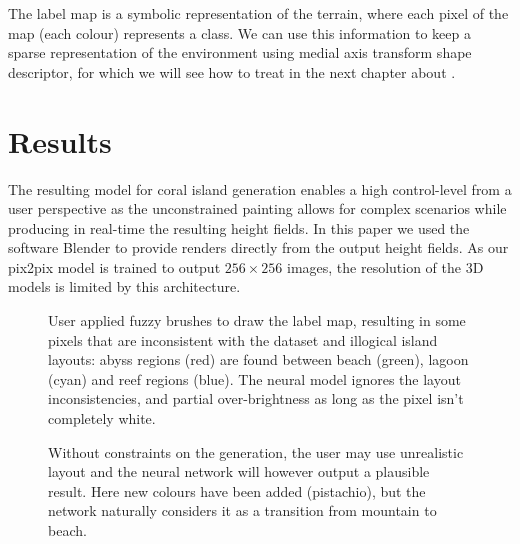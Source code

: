 The label map is a symbolic representation of the terrain, where each pixel of the map (each colour) represents a class. We can use this information to keep a sparse representation of the environment using medial axis transform shape descriptor, for which we will see how to treat in the next chapter about .


\section{Results}
\label{sec:coral-island-results}

The resulting model for coral island generation enables a high control-level from a user perspective as the unconstrained painting allows for complex scenarios while producing in real-time the resulting height fields. In this paper we used the software Blender to provide renders directly from the output height fields. As our pix2pix model is trained to output $256\times256$ images, the resolution of the 3D models is limited by this architecture.

\begin{figure}
\caption{User applied fuzzy brushes to draw the label map, resulting in some pixels that are inconsistent with the dataset and illogical island layouts: abyss regions (red) are found between beach (green), lagoon (cyan) and reef regions (blue). The neural model ignores the layout inconsistencies, and partial over-brightness as long as the pixel isn't completely white.}
\label{fig:coral-island-results-fuzzy}
\end{figure}
\begin{figure}
\caption{Without constraints on the generation, the user may use unrealistic layout and the neural network will however output a plausible result. Here new colours have been added (pistachio), but the network naturally considers it as a transition from mountain to beach.}
\label{fig:coral-island-results_dino}
\end{figure}

